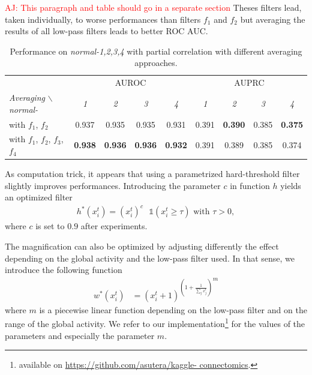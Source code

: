 \documentclass[wcp]{jmlr}
\begin{document}
\textcolor{red}{AJ: This paragraph and table should go in a separate section}
Theses filters lead, taken individually, to worse performances  than filters
$f_1$ and $f_2$ but averaging the results of all low-pass filters leads to better ROC AUC.
\begin{table}[ht]\label{tab:comparison}
\centering
\small
\begin{tabular}{| l | c c c c | c c c c |}
\hline
& \multicolumn{4}{c|}{AUROC} & \multicolumn{4}{c|}{AUPRC} \\
\textit{Averaging} $\backslash$ \textit{normal-} & \textit{1} & \textit{2} & \textit{3} & \textit{4} & \textit{1} & \textit{2} & \textit{3} & \textit{4} \\
\hline
\hline
 with $f_1$, $f_2$ & 0.937 & 0.935 & 0.935 & 0.931 & 0.391 &  \textbf{0.390} &  0.385 & \textbf{0.375}  \\
 with $f_1$, $f_2$, $f_3$, $f_4$ & \textbf{0.938} & \textbf{0.936} & \textbf{0.936} & \textbf{0.932} & 0.391 & 0.389 & 0.385 & 0.374\\
\hline
\end{tabular}
\caption{Performance on \textit{normal-1,2,3,4} with partial correlation with different averaging approaches.}
\end{table}

As computation trick, it appears that using a parametrized hard-threshold
filter slightly improves performances. Introducing the parameter $c$ in
function $h$ yields an optimized filter
\begin{align}
h^*(x^t_i) = (x_i^t)^c \text{ } \mathbb{1}(x_i^t \ge \tau) \text{ with } \tau > 0,
\end{align}
where $c$ is set to $0.9$ after experiments.

The magnification can also be optimized by adjusting differently the effect
depending on the global activity and the low-pass filter used. In that sense,
we introduce the following function
\begin{align}
 w^*(x^{t}_i) &= {(x^{t}_i + 1 )^{\left (1 + \frac{1}{\sum_{j} x^{t}_j}\right )}}^{m}
\end{align}
where $m$ is a piecewise linear function depending on the low-pass filter and
on the range of the global activity. We refer to our
implementation\footnote{available on \url{https://github.com/asutera/kaggle-
connectomics}.} for the values of the parameters and especially the parameter
$m$.
\end{document}
